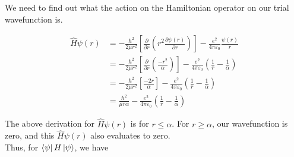     We need to find out what the action on the Hamiltonian operator on our trial wavefunction is.

    \begin{equation*}
    \begin{split}
        \hat{H}\psi(r) & = -\frac{\hbar^2}{2\mu    r^2} \left[\frac{\partial}{\partial r}\left(r^2\frac{\partial\psi(r)}{\partial r}\right)\right] - \frac{e^2}{4\pi\varepsilon_0}\frac{\psi(r)}{r} \\
        & = -\frac{\hbar^2}{2\mu   r^2} \left[\frac{\partial}{\partial r}\left(\frac{-r^{2}}{\alpha}\right)\right] - \frac{e^2}{4\pi\varepsilon_0}\left(\frac{1}{r} - \frac{1}{\alpha}\right) \\
        & = -\frac{\hbar^2}{2\mu   r^2} \left[ \frac{-2r}{\alpha}\right] - \frac{e^2}{4\pi\varepsilon_0}\left(\frac{1}{r} - \frac{1}{\alpha}\right) \\
        & = \frac{\hbar^2}{\mu r\alpha} - \frac{e^2}{4\pi\varepsilon_0}\left(\frac{1}{r} - \frac{1}{\alpha}\right)
    \end{split}
    \end{equation*}

    The above derivation for $\hat{H}\psi(r)$ is for $r \leqslant \alpha$. For $r \geqslant \alpha$, our wavefunction is zero, and this $\hat{H}\psi(r)$ also evaluates to zero.\\
    Thus, for $\bra{\psi}H\ket{\psi}$, we have

